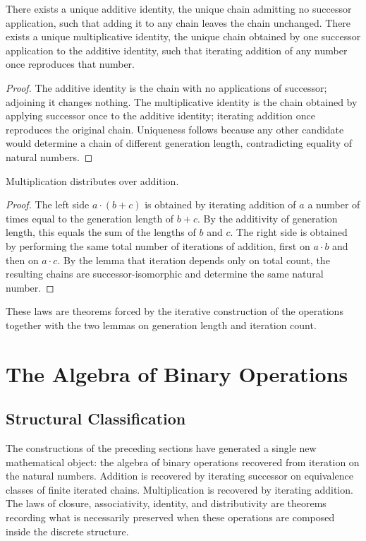 \documentclass[12pt,anyside]{book}
\begin{document}
\begin{theorem}
There exists a unique additive identity, the unique chain admitting no successor application, such that adding it to any chain leaves the chain unchanged. There exists a unique multiplicative identity, the unique chain obtained by one successor application to the additive identity, such that iterating addition of any number once reproduces that number.
\end{theorem}

\begin{proof}
The additive identity is the chain with no applications of successor; adjoining it changes nothing. The multiplicative identity is the chain obtained by applying successor once to the additive identity; iterating addition once reproduces the original chain. Uniqueness follows because any other candidate would determine a chain of different generation length, contradicting equality of natural numbers.
\end{proof}

\begin{theorem}[Distributivity]
Multiplication distributes over addition.
\end{theorem}

\begin{proof}
The left side $a \cdot (b + c)$ is obtained by iterating addition of $a$ a number of times equal to the generation length of $b + c$. By the additivity of generation length, this equals the sum of the lengths of $b$ and $c$. The right side is obtained by performing the same total number of iterations of addition, first on $a \cdot b$ and then on $a \cdot c$. By the lemma that iteration depends only on total count, the resulting chains are successor-isomorphic and determine the same natural number.
\end{proof}

These laws are theorems forced by the iterative construction of the operations together with the two lemmas on generation length and iteration count.

\section{The Algebra of Binary Operations}
\subsection{Structural Classification}
The constructions of the preceding sections have generated a single new mathematical object: the algebra of binary operations recovered from iteration on the natural numbers. Addition is recovered by iterating successor on equivalence classes of finite iterated chains. Multiplication is recovered by iterating addition. The laws of closure, associativity, identity, and distributivity are theorems recording what is necessarily preserved when these operations are composed inside the discrete structure.
\end{document}
